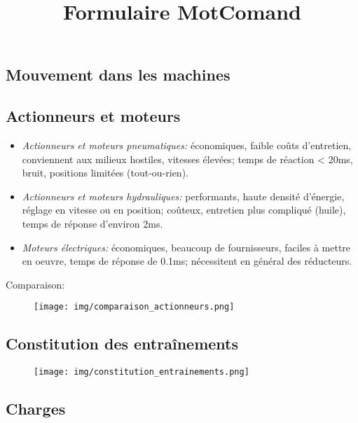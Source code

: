 \documentclass[10pt]{article} %
\title{Formulaire MotComand}
\begin{document}
	\begin{multicols}{3}
	\begin{flushleft}
		\section*{Mouvement dans les machines}
		
			\subsection*{Actionneurs et moteurs}
	
				\begin{itemize}
					\item \emph{Actionneurs et moteurs pneumatiques:} économiques, faible coûts d'entretien, conviennent aux milieux hostiles, vitesses élevées; temps de réaction < 20ms, bruit, positions limitées (tout-ou-rien).
					\item \emph{Actionneurs et moteurs hydrauliques:} performants, haute densité d'énergie, réglage en vitesse ou en position; coûteux, entretien plus compliqué (huile), temps de réponse d'environ 2ms.
					\item \emph{Moteurs électriques:} économiques, beaucoup de fournisseurs, faciles à mettre en oeuvre, temps de réponse de 0.1ms; nécessitent en général des réducteurs.
				\end{itemize}
				
				Comparaison:
				
				\begin{figure}[H]
					\texttt{[image: img/comparaison\_actionneurs.png]}
					\centering
				\end{figure}
			
			\subsection*{Constitution des entraînements}
				
				\begin{figure}[H]
					\texttt{[image: img/constitution\_entrainements.png]}
					\centering
				\end{figure}
				
			\subsection*{Charges}
				

\end{flushleft}
\end{multicols}
\end{document}
